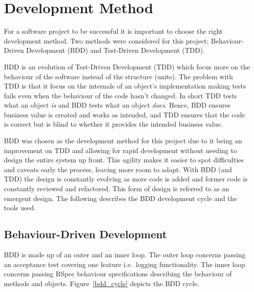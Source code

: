 \section{Development Method} %
\label{sec:development}

For a software project to be successful it is important to choose the right
development method. Two methods were considered for this project;
Behaviour-Driven Development (BDD) and Test-Driven Development (TDD).

BDD is an evolution of Test-Driven Development (TDD) which focus more on the
behaviour of the software instead of the structure (units). The problem with
TDD is that it focus on the internals of an object's implementation making
tests fails even when the behaviour of the code hasn't changed. In short TDD
tests what an object \textit{is} and BDD tests what an object
\textit{does}\cite{rspecbook}. Hence, BDD ensures business value is created and
works as intended, and TDD ensures that the code is correct but is blind to
whether it provides the intended business value.

BDD was chosen as the development method for this project due to it being an
improvement on TDD and allowing for rapid development without needing to
design the entire system up front. This agility makes it easier to spot
difficulties and caveats early the process, leaving more room to adapt. With
BDD (and TDD) the design is constantly evolving as more code is added and
former code is constantly reviewed and refactored. This form of design is
referred to as an emergent design. The following describes the BDD development
cycle and the tools used.

\subsection{Behaviour-Driven Development}
BDD is made up of an outer and an inner loop. The outer loop concerns passing
an acceptance test covering one feature i.e.\ logging functionality. The inner
loop concerns passing RSpec behaviour specifications describing the behaviour
of methods and objects. Figure~\ref{bdd_cycle} depicts the BDD cycle.

